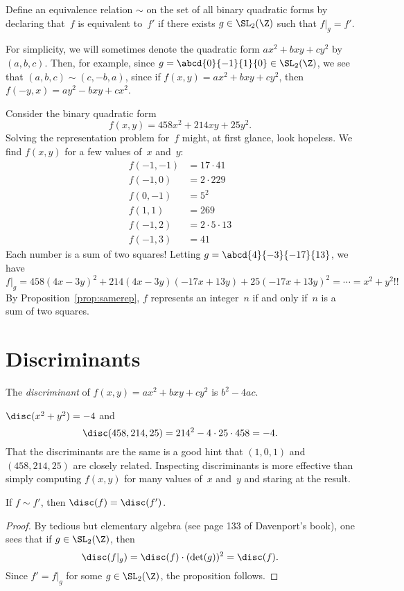 \documentclass[11pt]{report}
\begin{document}
Define an equivalence relation $\sim$ on the set of all binary
quadratic forms by declaring that~$f$ is equivalent to~$f'$ if
there exists $g\in\SL_2(\Z)$ such that $f|_g = f'$.

For simplicity, we will sometimes denote the quadratic form
$ax^2 + bxy+cy^2$ by $(a,b,c)$.
Then, for example, since $g=\abcd{0}{-1}{1}{\hfill 0}\in\SL_2(\Z)$,
we see that
$(a,b,c)\sim (c,-b,a)$,
since if $f(x,y) = ax^2 + bxy + cy^2$, then
$f(-y,x) = ay^2 - bxy + cx^2$.

\begin{example}
  Consider the binary quadratic form
  $$
    f(x,y) = 458x^2 + 214xy + 25y^2.
  $$
  Solving the representation problem for~$f$ might, at first glance,
  look hopeless.  We find $f(x,y)$ for a few values of~$x$
  and~$y$:
  \begin{align*}
    f(-1,-1) & =17\cdot 41       \\
    f(-1,0)  & =2\cdot 229       \\
    f(0,-1)  & =5^2              \\
    f(1,1)   & =269              \\
    f(-1,2)  & =2\cdot 5\cdot 13 \\
    f(-1,3)  & =41
  \end{align*}
  Each number is a sum of two squares!
  Letting $g=\abcd{\hfill4}{-3}{-17}{13}$, we have
  $$f|_g =
    458(4x-3y)^2 + 214(4x-3y)(-17x+13y)
    + 25(-17x+13y)^2 = \cdots = x^2 + y^2!!
  $$
  By Proposition~\ref{prop:samerep}, $f$ represents an integer~$n$
  if and only if~$n$ is a sum of two squares.
\end{example}


\section{Discriminants}
\begin{definition}
  The {\em discriminant} of $f(x,y) = ax^2 + bxy+cy^2$ is
  $b^2 - 4ac$.
\end{definition}
\begin{example}
  $\disc(x^2 + y^2) = -4$ and
  $$\disc(458,214,25) = 214^2 - 4\cdot 25\cdot 458 = -4.$$
  That the discriminants are the same is a good hint that
  $(1,0,1)$ and $(458,214,25)$ are closely related.
  Inspecting discriminants is more effective than simply computing $f(x,y)$
  for many values of~$x$ and~$y$ and staring at the result.
\end{example}
\begin{proposition}
  If $f\sim f'$, then $\disc(f) = \disc(f')$.
\end{proposition}
\begin{proof}
  By tedious but elementary algebra (see page 133 of Davenport's book),
  one sees that if $g\in\SL_2(\Z)$, then
  $$
    \disc(f|_g) = \disc(f)\cdot (\det(g))^2 = \disc(f).
  $$
  Since $f'=f|_g$ for some $g\in\SL_2(\Z)$, the proposition
  follows.
\end{proof}
\end{document}

